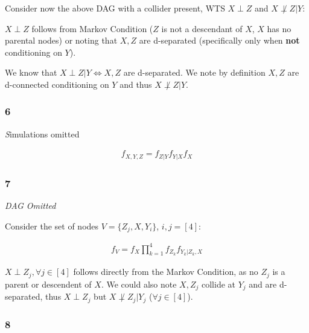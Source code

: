 \documentclass[11pt]{article}
\begin{document}
Consider now the above DAG with a collider present, WTS $X \perp Z$ and $X \not\perp Z | Y$:  \newline  
  
$X\perp Z$ follows from Markov Condition ($Z$ is not a descendant of $X$, $X$ has no parental nodes) or noting that $X,Z$ are d-separated (specifically only when \textbf{not} conditioning on $Y$). \newline 

We know that $X \perp Z | Y \Leftrightarrow X, Z$ are d-separated. We note by definition $X,Z$ are d-connected conditioning on $Y$ and thus $X \not\perp Z | Y$. 

\subsubsection{6}

{\textit Simulations omitted}

\begin{gather*}
    f_{X,Y,Z}
    =
    f_{Z|Y}f_{Y|X}f_X
\end{gather*}

\subsubsection{7}

{\it DAG Omitted}

Consider the set of nodes $V = \{Z_j, X, Y_i\}$, $i,j=[4]$: 

\begin{gather*}
    f_{V}
    =
    f_X
    \prod_{k=1}^4
    f_{Z_k}f_{Y_k | Z_k, X}
\end{gather*}

$X \perp Z_j, \forall j \in [4]$ follows directly from the Markov Condition, as no $Z_j$ is a parent or descendent of $X$. We could also note $X, Z_j$ collide at $Y_j$ and are d-separated, thus $X\perp Z_j$ but $X \not\perp Z_j | Y_j$ ($\forall j \in [4]$). 


\subsubsection{8}
\end{document}
